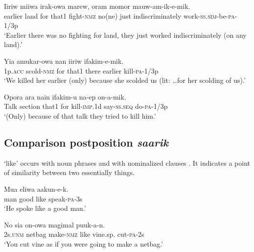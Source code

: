 \ea%
\label{ex:3:x756}
\gll Iiriw miiwa   irak-owa marew, oram momor mauw-am-ik-e-mik.\\
earlier land for that1 fight-\textsc{nmz} no(ne) just indiscriminately work-\textsc{ss}.\textsc{sim}-be-\textsc{pa}-1/3p\\
\glt`Earlier there was no fighting for land, they just worked indiscriminately (on any land).'
\z

\ea%
\label{ex:3:x1876}
\gll Yia amukar-owa   nan iiriw ifakim-e-mik. \\
1p.\textsc{acc} scold-\textsc{nmz} for that1 there earlier kill-\textsc{pa}-1/3p\\
\glt`We killed her earlier (only) because she scolded us (lit: {\dots}for her scolding of us).'
\z

\ea%
\label{ex:3:x759}
\gll Opora ara nain  ifakim-u na-ep on-a-mik. \\
Talk section that1 for kill-\textsc{imp}.1d say-\textsc{ss}.\textsc{seq} do-\textsc{pa}-1/3p\\
\glt`(Only) because of that talk they tried to kill him.'
\z

\subsection{Comparison postposition \textit{saarik}}\label{sec:3.12.3}
{}
 `like' occurs with noun phrases  and with nominalized clauses . It indicates a point of similarity between two essentially  things.

\ea%
\label{ex:3:x760}
\gll Mua eliwa  aakun-e-k. \\
man good like speak-\textsc{pa}-3s\\
\glt`He spoke like a good man.'
\z

\ea%
\label{ex:3:x761}
\gll No sia on-owa  magimal puuk-a-n. \\
2s.\textsc{unm} netbag make-\textsc{nmz} like vine.sp. cut-\textsc{pa}-2s\\
\glt`You cut  vine as if you were going to make a netbag.'
\z

